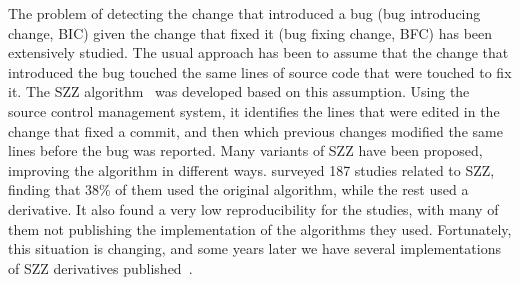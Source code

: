 
The problem of detecting the change that introduced a bug (bug introducing change, BIC) given the change that fixed it (bug fixing change, BFC) has been extensively studied\cite{sinha2010buginnings,davies2014comparing,sliwerski2005changes,kim2006automatic,williams2008szz,kamei2012large,tantithamthavorn2013mining}. The usual approach has been to assume that the change that introduced the bug touched the same lines of source code that were touched to fix it. The SZZ algorithm~\cite{sliwerski2005changes} was developed based on this assumption. Using the source control management system, it identifies the lines that were edited in the change that fixed a commit, and then which previous changes modified the same lines before the bug was reported. Many variants of SZZ have been proposed, improving the algorithm in different ways. \gema \cite{rodriguez2018reproducibility} surveyed 187 studies related to SZZ, finding that 38\% of them used the original algorithm, while the rest used a derivative. It also found a very low reproducibility for the studies, with many of them not publishing the implementation of the algorithms they used. Fortunately, this situation is changing, and some years later we have several implementations of SZZ derivatives published~\cite{borg2019szz,lenarduzzi2020openszz,pokropinski2022szz,rosa2021evaluating}.

